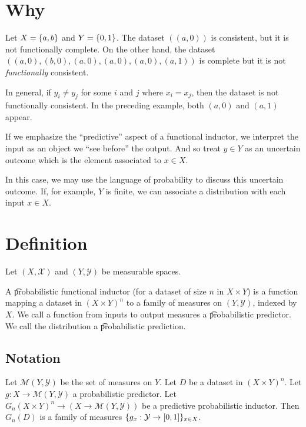 
\section*{Why}

Let $X = \{a, b\}$ and $Y = \{0, 1\}$.
The dataset $((a, 0))$ is consistent, but it is not functionally complete.
On the other hand, the dataset $((a,0), (b,0), (a,0), (a,0), (a,0), (a, 1))$
is complete but it is not \textit{functionally} consistent.

In general, if $y_i \neq y_j$ for some $i$ and $j$ where $x_i = x_j$, then the dataset is not functionally consistent.
In the preceding example, both $(a, 0)$ and $(a, 1)$ appear.

If we emphasize the ``predictive'' aspect of a functional inductor, we interpret the input as an object we ``see before'' the output.
And so treat $y \in Y$ as an uncertain outcome which is the element associated to $x \in X$.

In this case, we may use the language of probability to discuss this uncertain outcome.
If, for example, $Y$ is finite, we can associate a distribution with each input $x \in X$.

\section*{Definition}

Let $(X, \mathcal{X} )$ and $(Y, \mathcal{Y} )$ be measurable spaces.

A \t{probabilistic functional inductor} (for a dataset of size $n$ in $X \times Y$) is a function mapping a dataset in $(X \times Y)^n$ to a family of measures on $(Y, \mathcal{Y} )$, indexed by $X$.
We call a function from inputs to output measures a \t{probabilistic predictor}.
We call the distribution a \t{probabilistic prediction}.

\subsection*{Notation}

Let $\mathcal{M} (Y, \mathcal{Y} )$ be the set of measures on $Y$.
Let $D$ be a dataset in $(X \times  Y)^n$.
Let $g: X \to \mathcal{M} (Y, \mathcal{Y} )$ a probabilistic predictor.
Let $G_n (X \times Y)^n \to (X \to \mathcal{M} (Y, \mathcal{Y} ))$ be a predictive probabilistic inductor.
Then $G_n(D)$ is a family of measures $\{g_x: \mathcal{Y} \to [0, 1]\}_{x \in X}$.

\blankpage